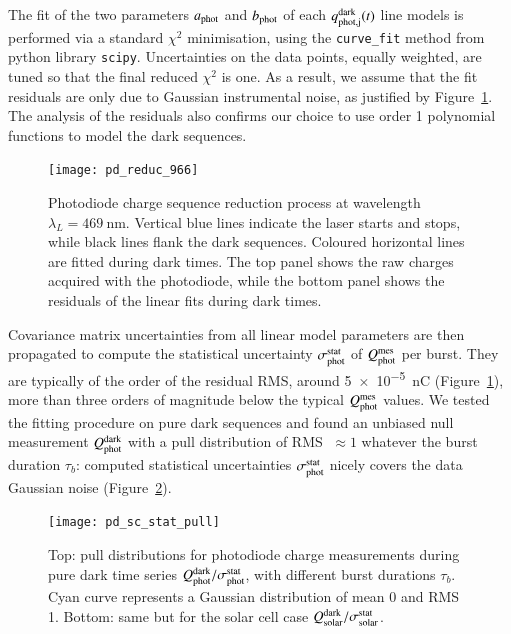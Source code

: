 The fit of the two parameters $a_{\rm phot}$ and $b_{\rm phot}$ of each $q_{\rm phot,j}^{\rm dark}(t)$ line models is performed via a standard $\chi^2$ minimisation, using the \texttt{curve\_fit} method from python library \texttt{scipy}. Uncertainties on the data points, equally weighted, are tuned so that the final reduced $\chi^2$ is one. As a result, we assume that the fit residuals are only due to Gaussian instrumental noise, as justified by Figure~\ref{fig:pd_reduc}. The analysis of the residuals also confirms our choice to use order 1 polynomial functions to model the dark sequences.



\begin{figure}[!h]
\centering
\texttt{[image: pd\_reduc\_966]}
\caption{Photodiode charge sequence reduction process at wavelength $\lambda_L=\SI{469}{\nm}$. Vertical blue lines indicate the laser starts and stops, while black lines flank the dark sequences. Coloured horizontal lines are fitted during dark times. The top panel shows the raw charges acquired with the photodiode, while the bottom panel shows the residuals of the linear fits during dark times.}\label{fig:pd_reduc}
\end{figure}

Covariance matrix uncertainties from all linear model parameters are then propagated to compute the statistical uncertainty $\sigma_{\mathrm{phot}}^{\mathrm{stat}}$ of $Q_{\mathrm{phot}}^{\mathrm{mes}}$ per burst. They are typically of the order of the residual RMS, around \SI{5e-5}{\nano\coulomb} (Figure~\ref{fig:pd_reduc}), more than three orders of magnitude below the typical $Q_{\mathrm{phot}}^{\mathrm{mes}}$ values. We tested the fitting procedure on pure dark sequences and found an unbiased null measurement $Q_{\mathrm{phot}}^{\rm dark}$ with a pull distribution of RMS $\;\approx 1$ whatever the burst duration $\tau_b$: computed statistical uncertainties $\sigma_{\mathrm{phot}}^{\mathrm{stat}}$ nicely covers the data Gaussian noise (Figure~\ref{fig:charge_pull}).

\begin{figure}[!h]
\centering
\texttt{[image: pd\_sc\_stat\_pull]}
\caption{Top: pull distributions for photodiode charge measurements during pure dark time series $Q_{\mathrm{phot}}^{\rm dark} / \sigma_{\mathrm{phot}}^{\mathrm{stat}}$, with different burst durations $\tau_b$. Cyan curve represents a Gaussian distribution of mean 0 and RMS 1. Bottom: same but for the solar cell case $Q_{\mathrm{solar}}^{\rm dark} / \sigma_{\mathrm{solar}}^{\mathrm{stat}}$.}\label{fig:charge_pull}
\end{figure}



